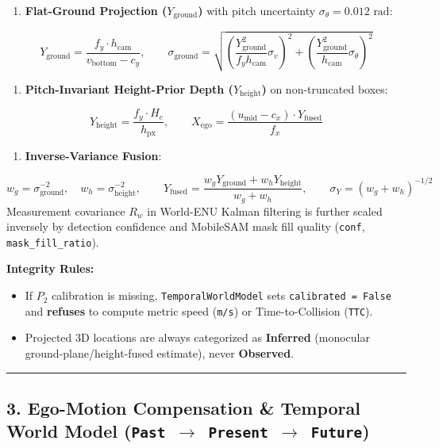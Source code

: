 \documentclass[10.5pt,a4paper]{article}
\begin{document}
\begin{enumerate}[leftmargin=1.8em,itemsep=2pt]
\item \textbf{Flat-Ground Projection ($Y_{\text{ground}}$)} with pitch uncertainty $\sigma_\theta = 0.012\text{ rad}$:
\end{enumerate}
\[Y_{\text{ground}} = \frac{f_y \cdot h_{\text{cam}}}{v_{\text{bottom}} - c_y}, \qquad \sigma_{\text{ground}} = \sqrt{\left(\frac{Y_{\text{ground}}^2}{f_y h_{\text{cam}}}\sigma_v\right)^2 + \left(\frac{Y_{\text{ground}}^2}{h_{\text{cam}}}\sigma_\theta\right)^2}\]
\begin{enumerate}[leftmargin=1.8em,itemsep=2pt]
\item \textbf{Pitch-Invariant Height-Prior Depth ($Y_{\text{height}}$)} on non-truncated boxes:
\end{enumerate}
\[Y_{\text{height}} = \frac{f_y \cdot H_c}{h_{\text{px}}}, \qquad X_{\text{ego}} = \frac{(u_{\text{mid}} - c_x) \cdot Y_{\text{fused}}}{f_x}\]
\begin{enumerate}[leftmargin=1.8em,itemsep=2pt]
\item \textbf{Inverse-Variance Fusion}:
\end{enumerate}
\[w_g = \sigma_{\text{ground}}^{-2}, \quad w_h = \sigma_{\text{height}}^{-2}, \qquad Y_{\text{fused}} = \frac{w_g Y_{\text{ground}} + w_h Y_{\text{height}}}{w_g + w_h}, \qquad \sigma_Y = (w_g + w_h)^{-1/2}\]
Measurement covariance $R_w$ in World-ENU Kalman filtering is further scaled inversely by detection confidence and MobileSAM mask fill quality (\texttt{conf}, \texttt{mask\_\allowbreak{}fill\_\allowbreak{}ratio}).


\textbf{Integrity Rules:}

\begin{itemize}[leftmargin=1.5em,itemsep=2pt]
\item If $P_2$ calibration is missing, \texttt{TemporalWorldModel} sets \texttt{calibrated = False} and \textbf{refuses} to compute metric speed (\texttt{m/\allowbreak{}s}) or Time-to-Collision (\texttt{TTC}).
\item Projected 3D locations are always categorized as \textbf{Inferred} (monocular ground-plane/height-fused estimate), never \textbf{Observed}.
\end{itemize}

\par\noindent\rule{\textwidth}{0.4pt}\par\medskip

\subsection{3. Ego-Motion Compensation \& Temporal World Model (\texttt{Past $\rightarrow$ Present $\rightarrow$ Future})}
\end{document}
